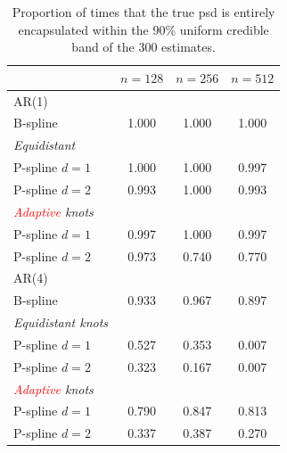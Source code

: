 \documentclass[twocolumn,final]{svjour3}
\begin{document}
\begin{table}
	\centering
		\begin{tabular}{lccc}
			\toprule
			& $n=128$ & $n=256$ & $n=512$ \\ \hline
			AR(1)     &  &  &  \\ 
			B-spline &  1.000 & 1.000 & 1.000 \\
			\textit{Equidistant}& & &   \\
			\hspace{0.5em}P-spline $d=1$&  1.000 & 1.000 & 0.997\\
			\hspace{0.5em}P-spline $d=2$& 0.993 & 1.000 & 0.993  \\
			\textit{\textcolor{red}{Adaptive} knots}& & &   \\
			\hspace{0.5em}P-spline $d=1$ & 0.997 & 1.000 & 0.997 \\
			\hspace{0.5em}P-spline $d=2$ & 0.973 & 0.740 & 0.770 \\ \hline		       
			AR(4)     &  &  &  \\ 
			B-spline &  0.933 & 0.967 & 0.897  \\
			\textit{Equidistant knots}& & &   \\
			\hspace{0.5em}P-spline $d=1$ &  0.527 & 0.353 & 0.007 \\
			\hspace{0.5em}P-spline $d=2$ & 0.323 & 0.167 & 0.007\\
			\textit{\textcolor{red}{Adaptive} knots}& & &   \\	
			\hspace{0.5em}P-spline $d=1$ & 0.790 & 0.847 & 0.813 \\
			\hspace{0.5em}P-spline $d=2$ & 0.337 & 0.387 & 0.270 \\
			\bottomrule
		\end{tabular}
	\caption{Proportion of times that the true psd is entirely encapsulated within the 90\% uniform credible band of the 300 estimates.}
	\label{table:sim_covPbb}
\end{table}
\end{document}
